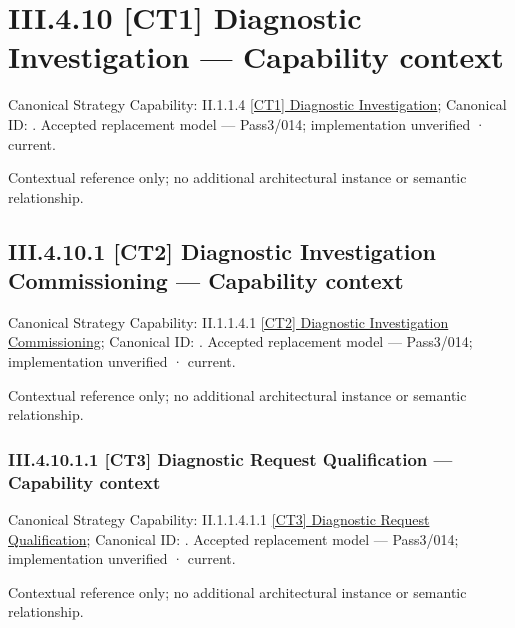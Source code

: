 \section*{III.4.10 [CT1] Diagnostic Investigation — Capability context}
\label{navigation:III.4.10}

{\small Canonical Strategy Capability: II.1.1.4 \hyperref[element:56d099bca3af4d87813fd0a7742987ee]{[CT1] Diagnostic Investigation}; Canonical ID: \texttt{}. Accepted replacement model — Pass3/014; implementation unverified · current.}\par
Contextual reference only; no additional architectural instance or semantic relationship.\par
\subsection*{III.4.10.1 [CT2] Diagnostic Investigation Commissioning — Capability context}
\label{navigation:III.4.10.1}

{\small Canonical Strategy Capability: II.1.1.4.1 \hyperref[element:5072e49fdf4f4e8da7e928b56b390137]{[CT2] Diagnostic Investigation Commissioning}; Canonical ID: \texttt{}. Accepted replacement model — Pass3/014; implementation unverified · current.}\par
Contextual reference only; no additional architectural instance or semantic relationship.\par
\subsubsection*{III.4.10.1.1 [CT3] Diagnostic Request Qualification — Capability context}
\label{navigation:III.4.10.1.1}

{\small Canonical Strategy Capability: II.1.1.4.1.1 \hyperref[element:aa18023812014178b3c49df16bf39e5c]{[CT3] Diagnostic Request Qualification}; Canonical ID: \texttt{}. Accepted replacement model — Pass3/014; implementation unverified · current.}\par
Contextual reference only; no additional architectural instance or semantic relationship.\par

